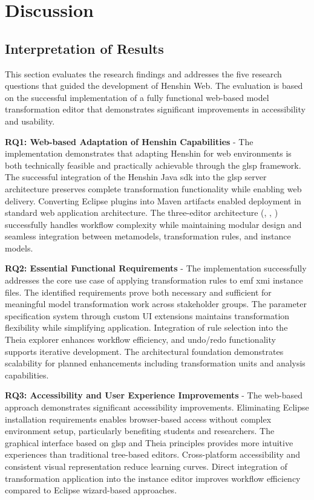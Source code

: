 \chapter{Discussion}
  \label{sec:discussion}

  \section{Interpretation of Results}
  \label{subsec:interpretation-results}

  This section evaluates the research findings and addresses the five research questions that guided the development of Henshin Web. The evaluation is based on the successful implementation of a fully functional web-based model transformation editor that demonstrates significant improvements in accessibility and usability.

  \textbf{RQ1: Web-based Adaptation of Henshin Capabilities} - The implementation demonstrates that adapting Henshin for web environments is both technically feasible and practically achievable through the \ac{glsp} framework. The successful integration of the Henshin Java \ac{sdk} into the \ac{glsp} server architecture preserves complete transformation functionality while enabling web delivery. Converting Eclipse plugins into Maven artifacts enabled deployment in standard web application architecture. The three-editor architecture (, , ) successfully handles workflow complexity while maintaining modular design and seamless integration between metamodels, transformation rules, and instance models.

  \textbf{RQ2: Essential Functional Requirements} - The implementation successfully addresses the core use case of applying transformation rules to \ac{emf} \ac{xmi} instance files. The identified requirements prove both necessary and sufficient for meaningful model transformation work across stakeholder groups. The parameter specification system through custom UI extensions maintains transformation flexibility while simplifying application. Integration of rule selection into the Theia explorer enhances workflow efficiency, and undo/redo functionality supports iterative development. The architectural foundation demonstrates scalability for planned enhancements including transformation units and analysis capabilities.

  \textbf{RQ3: Accessibility and User Experience Improvements} - The web-based approach demonstrates significant accessibility improvements. Eliminating Eclipse installation requirements enables browser-based access without complex environment setup, particularly benefiting students and researchers. The graphical interface based on \ac{glsp} and Theia principles provides more intuitive experiences than traditional tree-based editors. Cross-platform accessibility and consistent visual representation reduce learning curves. Direct integration of transformation application into the instance editor improves workflow efficiency compared to Eclipse wizard-based approaches.

